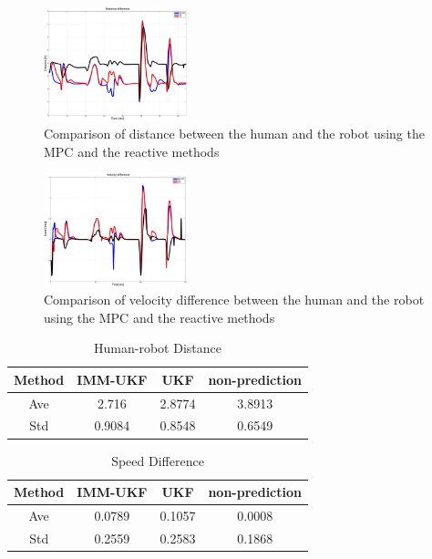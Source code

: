 \documentclass[letterpaper, 10 pt, conference]{ieeeconf}
\begin{document}
	\begin{figure}
		\centering
		\includegraphics[width=0.37\textwidth]{figures/dis_diff.pdf}
		\caption{Comparison of distance between the human and the robot using the MPC and the reactive methods}
		\label{fig:err_d}
	\end{figure}
	
	\begin{figure}
		\centering
		\includegraphics[width=0.37\textwidth]{figures/vel_diff.pdf}
		\caption{Comparison of velocity difference between the human and the robot using the MPC and the reactive methods}
		\label{fig:err_v}
	\end{figure}
	
	\begin{table}
		\caption{Human-robot Distance}
		\captionsetup{width=.5\textwidth}
		\centering
		\begin{tabular}{|c|c|c|c|}
			\hline
			Method & IMM-UKF & UKF & non-prediction\\
			\hline
			Ave & 2.716 & 2.8774 & 3.8913\\
			\hline
			Std & 0.9084 & 0.8548 & 0.6549\\
			\hline
		\end{tabular}
		\label{table:distance}
	\end{table}
	
	\begin{table}
		\caption{Speed Difference}
		\captionsetup{width=.5\textwidth}
		\centering
		\begin{tabular}{|c|c|c|c|}
			\hline
			Method & IMM-UKF & UKF & non-prediction\\
			\hline
			Ave & 0.0789 & 0.1057 & 0.0008\\
			\hline
			Std & 0.2559 & 0.2583 & 0.1868\\
			\hline
		\end{tabular}
		\label{table:speed}
	\end{table}
	
\end{document}
